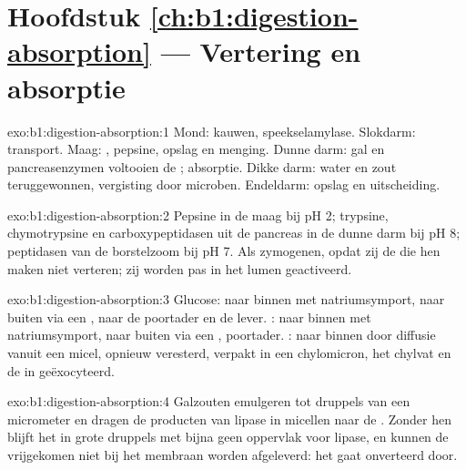 \section*{Hoofdstuk \ref{ch:b1:digestion-absorption} --- Vertering en absorptie}

\begin{solution}{exo:b1:digestion-absorption:1}
Mond: kauwen, speekselamylase. Slokdarm: transport. Maag: , pepsine,
opslag en menging. Dunne darm: gal en pancreasenzymen voltooien de
; absorptie. Dikke darm: water en zout teruggewonnen, vergisting
door microben. Endeldarm: opslag en uitscheiding.
\end{solution}

\begin{solution}{exo:b1:digestion-absorption:2}
Pepsine in de maag bij pH 2; trypsine, chymotrypsine en carboxypeptidasen
uit de pancreas in de dunne darm bij pH 8; peptidasen van de borstelzoom
bij pH 7. Als zymogenen, opdat zij de  die hen maken niet verteren;
zij worden pas in het lumen geactiveerd.
\end{solution}

\begin{solution}{exo:b1:digestion-absorption:3}
Glucose: naar binnen met natriumsymport, naar buiten via een , naar
de poortader en de lever. : naar binnen met natriumsymport, naar
buiten via een , poortader. : naar binnen door diffusie
vanuit een micel, opnieuw veresterd, verpakt in een chylomicron, het
chylvat en de  in geëxocyteerd.
\end{solution}

\begin{solution}{exo:b1:digestion-absorption:4}
Galzouten emulgeren  tot druppels van een micrometer en dragen de
producten van lipase in micellen naar de . Zonder hen blijft het
 in grote druppels met bijna geen oppervlak voor lipase, en kunnen de
vrijgekomen  niet bij het membraan worden afgeleverd: het  gaat
onverteerd door.
\end{solution}

